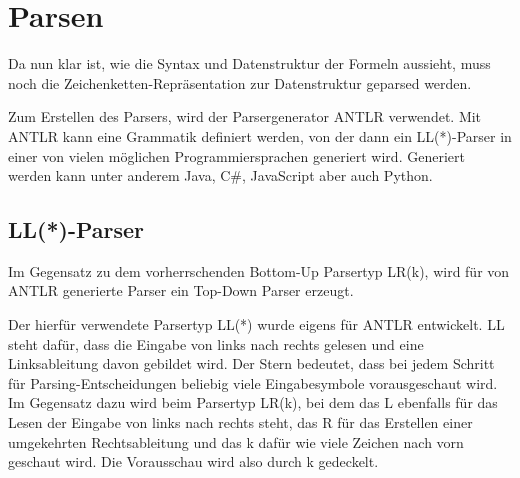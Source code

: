 \section{Parsen}
Da nun klar ist, wie die Syntax und Datenstruktur der Formeln aussieht, muss noch die Zeichenketten-Repräsentation zur Datenstruktur geparsed werden.

Zum Erstellen des Parsers, wird der Parsergenerator ANTLR verwendet. Mit ANTLR kann eine Grammatik definiert werden, von der dann ein LL(*)-Parser in einer von vielen möglichen Programmiersprachen generiert wird. Generiert werden kann unter anderem Java, C\#, JavaScript aber auch Python. \cite{antlr_doc}

\subsection{LL(*)-Parser}
Im Gegensatz zu dem vorherrschenden Bottom-Up Parsertyp LR(k), wird für von ANTLR generierte Parser ein Top-Down Parser erzeugt. \cite{compiler_dragon_book}\cite{ll_star_parser}

Der hierfür verwendete Parsertyp LL(*) wurde eigens für ANTLR entwickelt. LL steht dafür, dass die Eingabe von links nach rechts gelesen und eine Linksableitung davon gebildet wird. Der Stern bedeutet, dass bei jedem Schritt für Parsing-Entscheidungen beliebig viele Eingabesymbole vorausgeschaut wird. \cite{ll_star_parser} Im Gegensatz dazu wird beim Parsertyp LR(k), bei dem das L ebenfalls für das Lesen der Eingabe von links nach rechts steht, das R für das Erstellen einer umgekehrten Rechtsableitung und das k dafür wie viele Zeichen nach vorn geschaut wird. Die Vorausschau wird also durch k gedeckelt. \cite{compiler_dragon_book}

